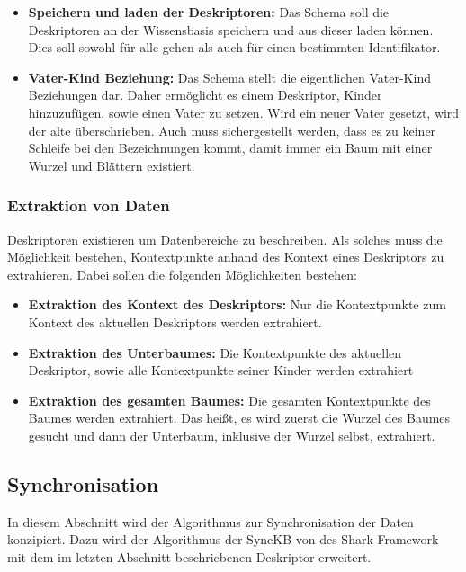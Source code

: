 \documentclass[a4paper]{article}
\begin{document}
	\begin{itemize}
		\item \textbf{Speichern und laden der Deskriptoren:} Das Schema soll die
		 Deskriptoren an der Wissensbasis speichern und aus dieser laden können.
		 Dies soll sowohl für alle gehen als auch für einen bestimmten
		 Identifikator.
		\item \textbf{Vater-Kind Beziehung:} Das Schema stellt die eigentlichen
		Vater-Kind Beziehungen dar. Daher ermöglicht es einem Deskriptor, Kinder
		hinzuzufügen, sowie einen Vater zu setzen. Wird ein neuer Vater gesetzt,
		wird der alte überschrieben. Auch muss sichergestellt werden, dass
		es zu keiner Schleife bei den Bezeichnungen kommt, damit immer ein Baum
		mit einer Wurzel und Blättern existiert.
	\end{itemize}
	
	\subsubsection{Extraktion von Daten}
	\label{sec:extraction}
	
	Deskriptoren existieren um Datenbereiche zu beschreiben. Als solches 
	muss die Möglichkeit bestehen, Kontextpunkte anhand des Kontext eines Deskriptors
	zu extrahieren. Dabei sollen die folgenden Möglichkeiten bestehen:
	
	\begin{itemize}
		\item \textbf{Extraktion des Kontext des Deskriptors:} Nur die Kontextpunkte
		zum Kontext des aktuellen Deskriptors werden extrahiert.
		\item \textbf{Extraktion des Unterbaumes:} Die Kontextpunkte des aktuellen
		 Deskriptor, sowie alle Kontextpunkte seiner Kinder werden extrahiert
		\item \textbf{Extraktion des gesamten Baumes:} Die gesamten Kontextpunkte
		des Baumes werden extrahiert. Das heißt, es wird zuerst die Wurzel des
		Baumes gesucht und dann der Unterbaum, inklusive der Wurzel selbst,
		extrahiert.
	\end{itemize}
	
	\subsection{Synchronisation}
	
	In diesem Abschnitt wird der Algorithmus zur Synchronisation der Daten
	konzipiert. Dazu wird der Algorithmus der SyncKB von des Shark Framework 
	mit dem im letzten Abschnitt beschriebenen Deskriptor erweitert.
	
\end{document}
